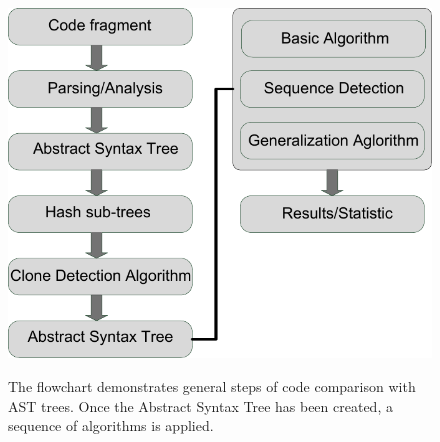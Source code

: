 \documentclass{report}
\begin{document}
\begin{figure}[h]
  \centering
  \includegraphics[scale=0.75]{Figures/exist-alg/ast-scheme2.pdf}\\[0.1cm]
  \caption[General steps of code comparison with AST tree]{The flowchart demonstrates general steps of code comparison with AST trees. Once the Abstract Syntax Tree has been created, a sequence of algorithms is applied.}
\end{figure}
\end{document}
